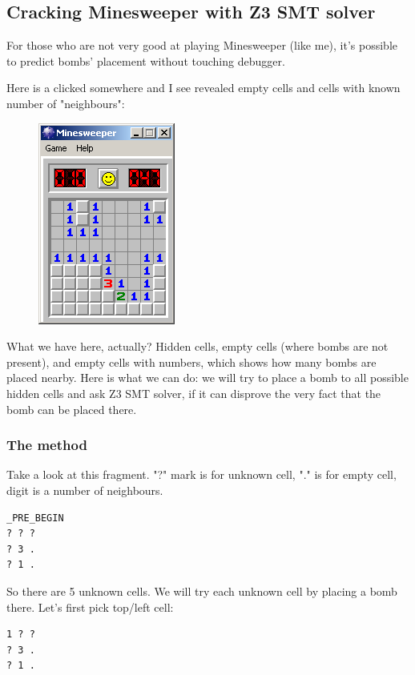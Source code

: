 \subsection{Cracking Minesweeper with Z3 SMT solver}
\label{minesweeper_SMT}

For those who are not very good at playing Minesweeper (like me), it's possible to predict bombs' placement without touching debugger.

Here is a clicked somewhere and I see revealed empty cells and cells with known number of "neighbours":

\begin{figure}[H]
\centering
\includegraphics[scale=0.75]{SMT/minesweeper/1.png}
\end{figure}

What we have here, actually? Hidden cells, empty cells (where bombs are not present), and empty cells with numbers, which shows how many bombs are placed nearby.
Here is what we can do: we will try to place a bomb to all possible hidden cells and ask Z3 SMT solver, if it can disprove the very fact that the bomb can be placed there.

\subsubsection{The method}

Take a look at this fragment. "?" mark is for unknown cell, "." is for empty cell, digit is a number of neighbours.

\begin{lstlisting}
_PRE_BEGIN
? ? ?
? 3 .
? 1 .
\end{lstlisting}

So there are 5 unknown cells.
We will try each unknown cell by placing a bomb there.
Let's first pick top/left cell:

\begin{lstlisting}
1 ? ?
? 3 .
? 1 .
\end{lstlisting}

